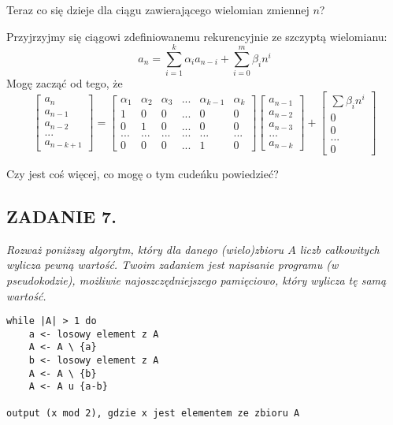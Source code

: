 \documentclass{article}
\begin{document}
Teraz co się dzieje dla ciągu zawierającego wielomian zmiennej $n$?

Przyjrzyjmy się ciągowi zdefiniowanemu rekurencyjnie ze szczyptą wielomianu:
$$a_n=\sum\limits_{i=1}^k\alpha_ia_{n-i}+\sum\limits_{i=0}^m\beta_in^i$$
Mogę zacząć od tego, że
$$\begin{bmatrix}
    a_n\\a_{n-1}\\a_{n-2}\\...\\a_{n-k+1}
\end{bmatrix}=\begin{bmatrix}
    \alpha_1 & \alpha_2 & \alpha_3 & ... &\alpha_{k-1} & \alpha_k\\
    1 & 0 & 0 & ... & 0 & 0\\
    0 & 1 & 0 & ... & 0 & 0\\
    ... & ... & ... & ... & ... & ...\\
    0 & 0 & 0 & ... & 1 & 0
\end{bmatrix}\begin{bmatrix}
    a_{n-1}\\a_{n-2}\\a_{n-3}\\...\\a_{n-k}
\end{bmatrix}+\begin{bmatrix}
    \sum\beta_in^i\\0\\0\\...\\0
\end{bmatrix}$$

{\color{orange}Czy jest coś więcej, co mogę o tym cudeńku powiedzieć?}

\subsection*{ZADANIE 7.}
\emph{Rozważ poniższy algorytm, który dla danego (wielo)zbioru $A$ liczb całkowitych wylicza pewną wartość. Twoim zadaniem jest napisanie programu (w pseudokodzie), możliwie najoszczędniejszego pamięciowo, który wylicza tę samą wartość.}

\begin{lstlisting}
while |A| > 1 do
    a <- losowy element z A
    A <- A \ {a}
    b <- losowy element z A
    A <- A \ {b}
    A <- A u {a-b}

output (x mod 2), gdzie x jest elementem ze zbioru A
\end{lstlisting}
\smallskip
\end{document}
